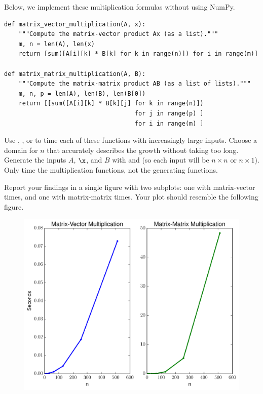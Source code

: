 \begin{problem}
Below, we implement these multiplication formulas without using NumPy.

\begin{lstlisting}
def matrix_vector_multiplication(A, x):
    """Compute the matrix-vector product Ax (as a list)."""
    m, n = len(A), len(x)
    return [sum([A[i][k] * B[k] for k in range(n)]) for i in range(m)]

def matrix_matrix_multiplication(A, B):
    """Compute the matrix-matrix product AB (as a list of lists)."""
    m, n, p = len(A), len(B), len(B[0])
    return [[sum([A[i][k] * B[k][j] for k in range(n)])
                                    for j in range(p) ]
                                    for i in range(m) ]
\end{lstlisting}

Use , , or  to time each of these functions with increasingly large inputs.
Choose a domain for $n$ that accurately describes the growth without taking too long.
Generate the inputs $A$, $\x$, and $B$ with  and  (so each input will be $n \times n$ or $n \times 1$).
Only time the multiplication functions, not the generating functions.

Report your findings in a single figure with two subplots: one with matrix-vector times, and one with matrix-matrix times.
Your plot should resemble the following figure.

\begin{figure}[H]
    \includegraphics[width=.7\textwidth]{matrixmultiplication1.pdf}
\end{figure}

\end{problem}


